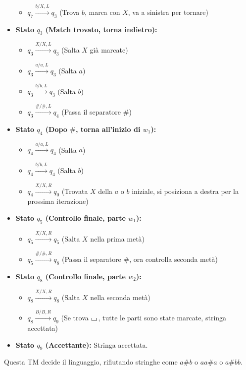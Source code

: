 \documentclass[a4paper]{article}
\theoremstyle{definition} %
\newcommand{\blankS}{\ensuremath{\raisebox{-0.15ex}{\scalebox{1.3}[0.7]{$\sqcup$}}\mkern2mu}}
\begin{document}
\begin{itemize}
\begin{itemize}
            \item $q_7 \xrightarrow{b / X, L} q_3$ (Trova $b$, marca con $X$, va a sinistra per tornare)
        \end{itemize}
    \item \textbf{Stato $q_3$ (Match trovato, torna indietro):}
        \begin{itemize}
            \item $q_3 \xrightarrow{X / X, L} q_3$ (Salta $X$ già marcate)
            \item $q_3 \xrightarrow{a / a, L} q_3$ (Salta $a$)
            \item $q_3 \xrightarrow{b / b, L} q_3$ (Salta $b$)
            \item $q_3 \xrightarrow{\# / \#, L} q_4$ (Passa il separatore $\#$)
        \end{itemize}
    \item \textbf{Stato $q_4$ (Dopo $\#$, torna all'inizio di $w_1$):}
        \begin{itemize}
            \item $q_4 \xrightarrow{a / a, L} q_4$ (Salta $a$)
            \item $q_4 \xrightarrow{b / b, L} q_4$ (Salta $b$)
            \item $q_4 \xrightarrow{X / X, R} q_0$ (Trovata $X$ della $a$ o $b$ iniziale, si posiziona a destra per la prossima iterazione)
        \end{itemize}
    \item \textbf{Stato $q_5$ (Controllo finale, parte $w_1$):}
        \begin{itemize}
            \item $q_5 \xrightarrow{X / X, R} q_5$ (Salta $X$ nella prima metà)
            \item $q_5 \xrightarrow{\# / \#, R} q_8$ (Passa il separatore $\#$, ora controlla seconda metà)
        \end{itemize}
    \item \textbf{Stato $q_8$ (Controllo finale, parte $w_2$):}
        \begin{itemize}
            \item $q_8 \xrightarrow{X / X, R} q_8$ (Salta $X$ nella seconda metà)
            \item $q_8 \xrightarrow{B / B, R} q_9$ (Se trova \blankS, tutte le parti sono state marcate, stringa accettata)
        \end{itemize}
    \item \textbf{Stato $q_9$ (Accettante):} Stringa accettata.
\end{itemize}
Questa TM decide il linguaggio, rifiutando stringhe come $a\#b$ o $aa\#a$ o $a\#bb$.
\end{document}
